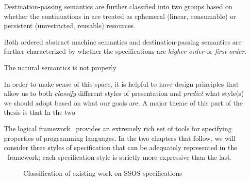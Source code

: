 \noindent
Destination-passing semantics are further classified into two groups
based on whether the continuations in are treated as ephemeral
(linear, consumable) or persistent (unrestricted, reusable) resources.

Both ordered abstract machine semantics and destination-passing 
semantics are further characterized by whether the specifications
are {\it higher-order} or {\it first-order}. 

The natural semantics is not properly 


 In order to make sense of this space, it is helpful to
have design principles that allow us to both {\it classify} different
styles of presentation and {\it predict} what style(s) we should adopt
based on what our goals are. A major theme of this part of the thesis
is that 
In the two 

The logical framework \sls~provides an extremely rich set of tools for
specifying properties of programming languages. In the two chapters
that follow, we will consider three styles of specification that can
be adequately represented in the \sls~framework; each specification
style is strictly more expressive than the last.

\cite{watkins02concurrent}
\cite{pfenning12chaining}

\begin{figure}
\begin{center}
\end{center}
\caption{Classification of existing work on SSOS specifications}
\label{fig:class-prevwork}
\end{figure}


